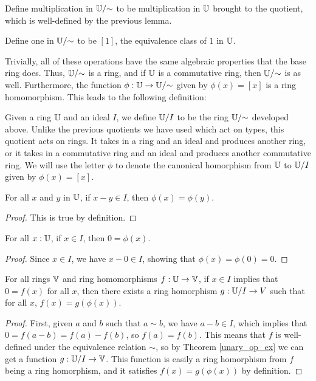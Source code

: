 \documentclass[../../math.tex]{subfiles}
\begin{document}
\begin{instance}
    Define multiplication in $\mathbb{U}/{\sim}$ to be multiplication in $\mathbb{U}$ brought to
    the quotient, which is well-defined by the previous lemma.
\end{instance}

\begin{instance}
    Define one in $\mathbb{U}/{\sim}$ to be $[1]$, the equivalence class of $1$ in
    $\mathbb{U}$.
\end{instance}

Trivially, all of these operations have the same algebraic properties that the
base ring does.  Thus, $\mathbb{U}/{\sim}$ is a ring, and if $\mathbb{U}$ is a commutative ring,
then $\mathbb{U}/{\sim}$ is as well.  Furthermore, the function $\phi : \mathbb{U} \to
\mathbb{U}/{\sim}$ given by $\phi(x) = [x]$ is a ring homomorphism.  This leads to the
following definition:

\begin{definition}
    Given a ring $\mathbb{U}$ and an ideal $I$, we define $\mathbb{U}/I$ to be the ring
    $\mathbb{U}/{\sim}$ developed above.  Unlike the previous quotients we have used
    which act on types, this quotient acts on rings.  It takes in a ring and an
    ideal and produces another ring, or it takes in a commutative ring and an
    ideal and produces another commutative ring.  We will use the letter $\phi$
    to denote the canonical homorphism from $\mathbb{U}$ to $\mathbb{U}/I$ given by $\phi(x) =
    [x]$.
\end{definition}

\begin{theorem} \label{to_qring_eq}
    For all $x$ and $y$ in $\mathbb{U}$, if $x - y \in I$, then $\phi(x) = \phi(y)$.
\end{theorem}
\begin{proof}
    This is true by definition.
\end{proof}

\begin{theorem} \label{to_qring_zero}
    For all $x : \mathbb{U}$, if $x \in I$, then $0 = \phi(x)$.
\end{theorem}
\begin{proof}
    Since $x \in I$, we have $x - 0 \in I$, showing that $\phi(x) = \phi(0) =
    0$.
\end{proof}

\begin{theorem} \label{qring_f_ex}
    For all rings $\mathbb{V}$ and ring homomorphisms $f : \mathbb{U} \to \mathbb{V}$, if $x \in I$
    implies that $0 = f(x)$ for all $x$, then there exists a ring homorphism $g
    : \mathbb{U}/I \to V$ such that for all $x$, $f(x) = g(\phi(x))$.
\end{theorem}
\begin{proof}
    First, given $a$ and $b$ such that $a \sim b$, we have $a - b \in I$, which
    implies that $0 = f(a - b) = f(a) - f(b)$, so $f(a) = f(b)$.  This means
    that $f$ is well-defined under the equivalence relation $\sim$, so by
    Theorem \ref{unary_op_ex} we can get a function $g : \mathbb{U}/I \to \mathbb{V}$.  This
    function is easily a ring homorphism from $f$ being a ring homorphism, and
    it satisfies $f(x) = g(\phi(x))$ by definition.
\end{proof}
\end{document}
